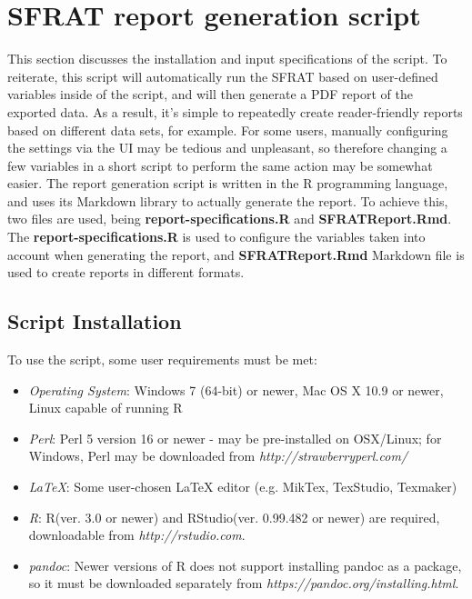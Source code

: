 \documentclass[conference]{IEEEtran}
\begin{document}
\section{SFRAT report generation script}\label{sec:Script}
This section discusses the installation and input specifications of the script. To reiterate, this script will automatically run the SFRAT based on user-defined variables inside of the script, and will then generate a PDF report of the exported data. As a result, it's simple to repeatedly create reader-friendly reports based on different data sets, for example. For some users, manually configuring the settings via the UI may be tedious and unpleasant, so therefore changing a few variables in a short script to perform the same action may be somewhat easier.
The report generation script is written in the R programming language, and uses its Markdown library to actually generate the report. To achieve this, two files are used, being \textbf{report-specifications.R} and
\textbf{SFRATReport.Rmd}. The \textbf{report-specifications.R} is used to configure the variables taken into account when generating the report, and \textbf{SFRATReport.Rmd} Markdown file is used to create reports in different formats.

\subsection{Script Installation}\label{sec:ScriptInstall}
To use the script, some user requirements must be met:
\begin{itemize}
  \item {\textit{Operating System}: Windows 7 (64-bit) or newer, Mac OS X 10.9 or newer, Linux capable of running R}
  \item {\textit{Perl}: Perl 5 version 16 or newer - may be pre-installed on OSX/Linux; for Windows, Perl may be downloaded from \textit{http://strawberryperl.com/}}
  \item{\textit{LaTeX}: Some user-chosen LaTeX editor (e.g. MikTex, TexStudio, Texmaker)}
  \item {\textit{R}: R(ver. 3.0 or newer) and RStudio(ver. 0.99.482 or newer) are required, downloadable from \textit{http://rstudio.com}}.
   \item{\textit{pandoc}: Newer versions of R does not support installing pandoc as a package, so it must be downloaded separately from \textit{https://pandoc.org/installing.html}.}
\end{itemize}
\end{document}
